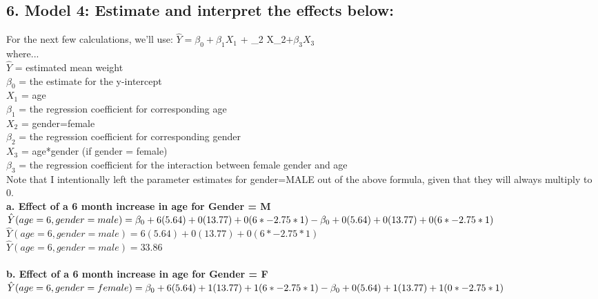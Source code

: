 \documentclass{article}
\begin{document}
\newpage
\subsection*{6. Model 4: Estimate and interpret the effects below:}





For the next few calculations, we'll use: $\hat{Y}=\beta_0 + \beta_1 X_1$  + \beta_2 X_2$  + \beta_3 X_3$ \\
where... \\
$\hat{Y}$ = estimated mean weight \\
$\beta_0$ = the estimate for the y-intercept \\
$X_1$ = age \\
$\beta_1$ = the regression coefficient for corresponding age\\
$X_2$ = gender=female \\
$\beta_2$ = the regression coefficient  for corresponding gender\\
$X_3$ = age*gender (if gender = female) \\
$\beta_3$ = the regression coefficient  for the interaction between female gender and age\\

\noindent Note that I intentionally left the parameter estimates for gender=MALE out of the above formula, given that they will always multiply to 0. \\

\noindent \textbf{a. Effect of a 6 month increase in age for Gender = M} \\
$\hat{Y}(age=6, gender=male) = \beta_0+ 6(5.64) + 0(13.77) + 0(6*-2.75*1) \\ - \beta_0+ 0(5.64) + 0(13.77) + 0(6*-2.75*1)$ \\
$\hat{Y}(age=6, gender=male) =  6(5.64) + 0(13.77) + 0(6*-2.75*1)$ \\
$\hat{Y}(age=6, gender=male) =  33.86$  \\

 \\



\noindent \textbf{b. Effect of a 6 month increase in age for Gender = F} \\
$\hat{Y}(age=6, gender=female) = \beta_0+ 6(5.64) + 1(13.77) + 1(6*-2.75*1) \\ 
- \beta_0+ 0(5.64) + 1(13.77) + 1(0*-2.75*1)$ \\
\end{document}
